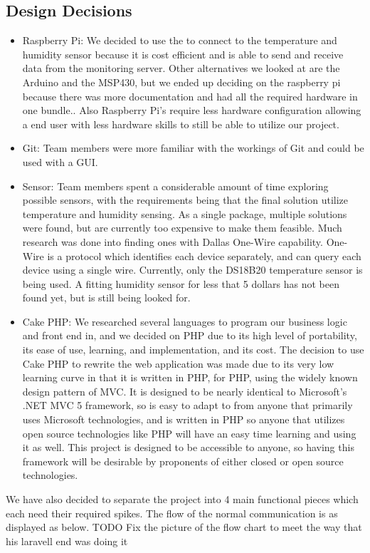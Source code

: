 \documentclass{report}
\begin{document}
\subsection*{Design Decisions}
\begin{itemize}
\item Raspberry Pi: We decided to use the to connect to the temperature and humidity sensor because it is cost efficient and is able to send and receive data from the monitoring server. Other alternatives we looked at are the Arduino and the MSP430, but we ended up deciding on the raspberry pi because there was more documentation and had all the required hardware in one bundle.. Also Raspberry Pi’s require less hardware configuration allowing a end user with less hardware skills to still be able to utilize our project.
\item Git: Team members were more familiar with the workings of Git and could be used with a GUI.
\item Sensor: Team members spent a considerable amount of time exploring possible sensors, with the requirements being that the final solution utilize temperature and humidity sensing. As a single package, multiple solutions were found, but are currently too expensive to make them feasible. Much research was done into finding ones with Dallas One-Wire capability. One-Wire is a protocol which identifies each device separately, and can query each device using a single wire. Currently, only the DS18B20 temperature sensor is being used. A fitting humidity sensor for less that 5 dollars has not been found yet, but is still being looked for.
\item Cake PHP: We researched several languages to program our business logic and front end in, and we decided on PHP due to its high level of portability, its ease of use, learning, and implementation, and its cost.  The decision to use Cake PHP to rewrite the web application was made due to its very low learning curve in that it is written in PHP, for PHP, using the widely known design pattern of MVC.  It is designed to be nearly identical to Microsoft’s .NET MVC 5 framework, so is easy to adapt to from anyone that primarily uses Microsoft technologies, and is written in PHP so anyone that utilizes open source technologies like PHP will have an easy time learning and using it as well.  This project is designed to be accessible to anyone, so having this framework will be desirable by proponents of either closed or open source technologies. 
\end{itemize}
We have also decided to separate the project into 4 main functional pieces which each need their required spikes. The flow of the normal communication is as displayed as below.
TODO Fix the picture of the flow chart to meet the way that his laravell end was doing it
\newpage
\end{document}
